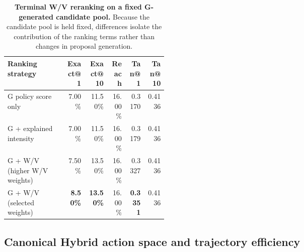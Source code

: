 \begin{table}[!htbp]
\centering
\caption{\textbf{Terminal W/V reranking on a fixed G-generated candidate pool.}
Because the candidate pool is held fixed, differences isolate the contribution
of the ranking terms rather than changes in proposal generation.}
\label{tab:wv_fixed_pool_reranking}
\small
\setlength{\tabcolsep}{3pt}

\begin{tabular}{@{}p{0.37\linewidth}rrrrr@{}}
\toprule
Ranking strategy & Exact@1 & Exact@10 & Reach & Tan@1 & Tan@10 \\
\midrule
G policy score only & 7.00\% & 11.50\% & 16.00\% & 0.3170 & 0.4136 \\
G + explained intensity & 7.00\% & 11.50\% & 16.00\% & 0.3179 & 0.4136 \\
G + W/V (higher W/V weights) & 7.50\% & 13.50\% & 16.00\% & 0.3327 & 0.4136 \\
G + W/V (selected weights) & \textbf{8.50\%} & \textbf{13.50\%} & 16.00\% & \textbf{0.3351} & 0.4136 \\
\bottomrule
\end{tabular}
\end{table}

\subsection{Canonical Hybrid action space and trajectory efficiency}

